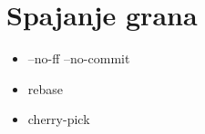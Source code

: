 \chapter*{Spajanje grana}

\begin{itemize}
   \item --no-ff --no-commit
   \item rebase
   \item cherry-pick
\end{itemize}


